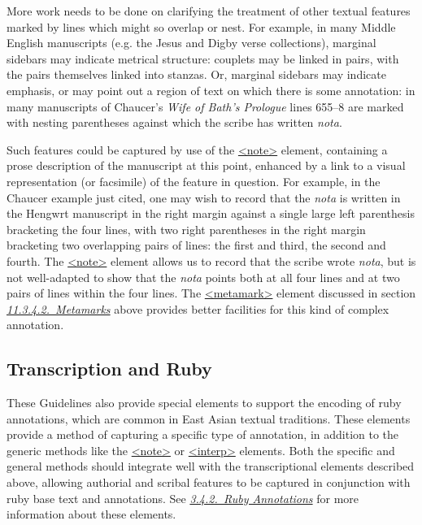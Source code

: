 More work needs to be done on clarifying the treatment of other textual features marked by lines which might so overlap or nest. For example, in many Middle English manuscripts (e.g. the Jesus and Digby verse collections), marginal sidebars may indicate metrical structure: couplets may be linked in pairs, with the pairs themselves linked into stanzas. Or, marginal sidebars may indicate emphasis, or may point out a region of text on which there is some annotation: in many manuscripts of Chaucer's \textit{Wife of Bath's Prologue} lines 655–8 are marked with nesting parentheses against which the scribe has written \textit{nota}.\par
Such features could be captured by use of the \hyperref[TEI.note]{<note>} element, containing a prose description of the manuscript at this point, enhanced by a link to a visual representation (or facsimile) of the feature in question. For example, in the Chaucer example just cited, one may wish to record that the \textit{nota} is written in the Hengwrt manuscript in the right margin against a single large left parenthesis bracketing the four lines, with two right parentheses in the right margin bracketing two overlapping pairs of lines: the first and third, the second and fourth. The \hyperref[TEI.note]{<note>} element allows us to record that the scribe wrote \textit{nota}, but is not well-adapted to show that the \textit{nota} points both at all four lines and at two pairs of lines within the four lines. The \hyperref[TEI.metamark]{<metamark>} element discussed in section \textit{\hyperref[PH-meta]{11.3.4.2.\ Metamarks}} above provides better facilities for this kind of complex annotation.
\subsection[{Transcription and Ruby}]{Transcription and Ruby}\label{PHRB}\par
These Guidelines also provide special elements to support the encoding of ruby annotations, which are common in East Asian textual traditions. These elements provide a method of capturing a specific type of annotation, in addition to the generic methods like the \hyperref[TEI.note]{<note>} or \hyperref[TEI.interp]{<interp>} elements. Both the specific and general methods should integrate well with the transcriptional elements described above, allowing authorial and scribal features to be captured in conjunction with ruby base text and annotations. See \textit{\hyperref[COHTGRB]{3.4.2.\ Ruby Annotations}} for more information about these elements.
